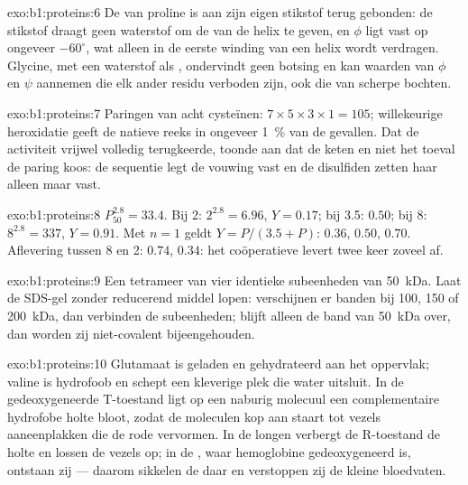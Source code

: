 \begin{solution}{exo:b1:proteins:6}
De  van proline is aan zijn eigen stikstof terug gebonden: de stikstof
draagt geen waterstof om de  van de helix te geven, en $\phi$ ligt
vast op ongeveer $-60^\circ$, wat alleen in de eerste winding van een helix wordt
verdragen. Glycine, met een waterstof als , ondervindt geen botsing en kan
waarden van $\phi$ en $\psi$ aannemen die elk ander residu verboden zijn, ook die
van scherpe bochten.
\end{solution}

\begin{solution}{exo:b1:proteins:7}
Paringen van acht cysteïnen: $7\times 5\times 3\times 1 = 105$; willekeurige
heroxidatie geeft de natieve reeks in ongeveer \qty{1}{\%} van de gevallen. Dat de
activiteit vrijwel volledig terugkeerde, toonde aan dat de keten en niet het toeval
de paring koos: de sequentie legt de vouwing vast en de disulfiden zetten haar
alleen maar vast.
\end{solution}

\begin{solution}{exo:b1:proteins:8}
$P_{50}^{2.8} = 33.4$. Bij 2: $2^{2.8} = 6.96$, $Y = 0.17$; bij 3.5: $0.50$; bij
8: $8^{2.8} = 337$, $Y = 0.91$. Met $n = 1$ geldt $Y =
P/(3.5 + P)$: $0.36$, $0.50$, $0.70$. Aflevering tussen 8 en 2: 
$0.74$,  $0.34$: het coöperatieve  levert twee keer zoveel af.
\end{solution}

\begin{solution}{exo:b1:proteins:9}
Een tetrameer van vier identieke subeenheden van \qty{50}{kDa}. Laat de SDS-gel
zonder reducerend middel lopen: verschijnen er banden bij 100, 150 of
\qty{200}{kDa}, dan verbinden  de subeenheden; blijft alleen de
band van \qty{50}{kDa} over, dan worden zij niet-covalent bijeengehouden.
\end{solution}

\begin{solution}{exo:b1:proteins:10}
Glutamaat is geladen en gehydrateerd aan het oppervlak; valine is hydrofoob en
schept een kleverige plek die water uitsluit. In de gedeoxygeneerde T-toestand ligt
op een naburig molecuul een complementaire hydrofobe holte bloot, zodat de
moleculen kop aan staart tot vezels aaneenplakken die de rode  vervormen. In de
longen verbergt de R-toestand de holte en lossen de vezels op; in de , waar
hemoglobine gedeoxygeneerd is, ontstaan zij --- daarom sikkelen de  daar en
verstoppen zij de kleine bloedvaten.
\end{solution}

